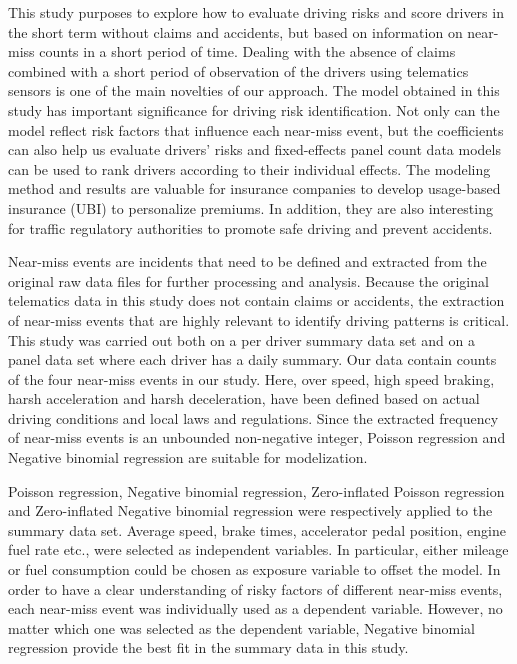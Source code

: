 \documentclass[num-refs]{wiley-article}
\begin{document}
This study purposes to explore how to evaluate driving risks and score drivers in the short term without claims and accidents, but based on information on near-miss counts in a short period of time. Dealing with the absence of claims combined with a short period of observation of the drivers using telematics sensors is one of the main novelties of our approach. The model obtained in this study has important significance for driving risk identification. Not only can the model reflect risk factors that influence each near-miss event, but the coefficients can also help us evaluate drivers' risks and fixed-effects panel count data models can be used to rank drivers according to their individual effects. The modeling method and results are valuable for insurance companies to develop usage-based insurance (UBI) to personalize premiums. In addition, they are also interesting for traffic regulatory authorities to promote safe driving and prevent accidents.

Near-miss events are incidents that need to be defined and extracted from the original raw data files for further processing and analysis. Because the original telematics data in this study does not contain claims or accidents, the extraction of near-miss events that are highly relevant to identify driving patterns is critical. This study was carried out both on a per driver summary data set and on a panel data set where each driver has a daily summary. Our data contain counts of the four near-miss events in our study. Here, over speed, high speed braking, harsh acceleration and harsh deceleration, have been defined based on actual driving conditions and local laws and regulations. Since the extracted frequency of near-miss events is an unbounded non-negative integer, Poisson regression and Negative binomial regression are suitable for modelization. 

Poisson regression, Negative binomial regression, Zero-inflated Poisson regression and Zero-inflated Negative binomial regression were respectively applied to the summary data set. Average speed, brake times, accelerator pedal position, engine fuel rate etc., were selected as independent variables. In particular, either mileage or fuel consumption could be chosen as exposure variable to offset the model. In order to have a clear understanding of risky factors of different near-miss events, each near-miss event was individually used as a dependent variable. However, no matter which one was selected as the dependent variable, Negative binomial regression provide the best fit in the summary data in this study.
\end{document}
